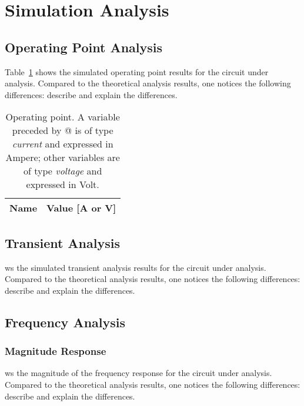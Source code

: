 \section{Simulation Analysis}
\label{sec:simulation}

\subsection{Operating Point Analysis}

Table~\ref{tab:op} shows the simulated operating point results for the circuit
under analysis. Compared to the theoretical analysis results, one notices the
following differences: describe and explain the differences.

\begin{table}[h]
  \centering
  \begin{tabular}{|l|r|}
    \hline    
    {\bf Name} & {\bf Value [A or V]} \\ \hline
    
  \end{tabular}
  \caption{Operating point. A variable preceded by @ is of type {\em current}
    and expressed in Ampere; other variables are of type {\it voltage} and expressed in
    Volt.}
  \label{tab:op}
\end{table}

\lipsum[1-1]


\subsection{Transient Analysis}

ws the simulated transient analysis results for the
circuit under analysis. Compared to the theoretical analysis results, one
notices the following differences: describe and explain the differences.


\lipsum[1-1]



\subsection{Frequency Analysis}

\subsubsection{Magnitude Response}
ws the magnitude of the frequency response for the
circuit under analysis. Compared to the theoretical analysis results, one
notices the following differences: describe and explain the differences.

